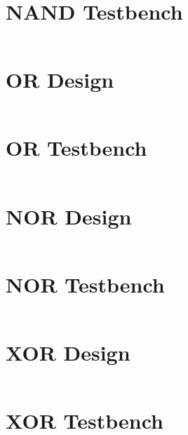\documentclass[
	letterpaper, %
	10pt, %
]{CSUniSchoolLabReport}
\begin{document}
\section{NAND Testbench}
\begin{center}
    \inputminted{octave}{verilog/nand_4b/nand_4b_test.v}
\end{center}

\section{OR Design}
\begin{center}
    \inputminted{octave}{verilog/or_4b/or_4b.v} %
\end{center}
\section{OR Testbench}
\begin{center}
    \inputminted{octave}{verilog/or_4b/or_4b_test.v} %
\end{center}

\section{NOR Design}
\begin{center}
    \inputminted{octave}{verilog/nor_4b/nor_4b.v} %
\end{center}
\section{NOR Testbench}
\begin{center}
    \inputminted{octave}{verilog/nor_4b/nor_4b_test.v} %
\end{center}

\section{XOR Design}
\begin{center}
    \inputminted{octave}{verilog/xor_4b/xor_4b.v} %
\end{center}
\section{XOR Testbench}
\begin{center}
    \inputminted{octave}{verilog/xor_4b/xor_4b_test.v} %
\end{center}
\end{document}
